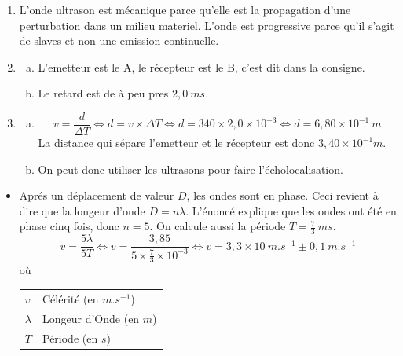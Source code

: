 \documentclass[12pt, a4paper]{article}
\makeatletter
\newenvironment{conditions}
  {\par\vspace{\abovedisplayskip}\noindent\begin{tabular}{>{$}l<{$} @{${\quad}={\quad}$} l}}
  {\end{tabular}\par\vspace{\belowdisplayskip}}
\makeatother
\begin{document}
    \begin{Exercise}[number={27}]
        \begin{enumerate}[1.]
            \item L'onde ultrason est mécanique parce qu'elle est la propagation d'une perturbation dans un milieu materiel. L'onde est progressive parce qu'il s'agit de slaves et non une emission continuelle.
            \item   \begin{enumerate}[a.]
                        \item L'emetteur est le {A}, le récepteur est le {B}, c'est dit dans la consigne.
                        \item Le retard est de à peu pres $2{,}0\ ms$.
                    \end{enumerate}
            \item   \begin{enumerate}[a.]
                        \item   \begin{equation*}
                                    v=\frac{d}{\Delta T}
                                    \iff d=v\times\Delta T
                                    \iff d=340\times 2{,}0\times 10^{-3}
                                    \iff d=6{,}80\times 10^{-1}\ m
                                \end{equation*}
                                La distance qui sépare l'emetteur et le récepteur est donc $3{,}40\times 10^{-1} m$.
                        \item On peut donc utiliser les ultrasons pour faire l'écholocalisation.
                    \end{enumerate}
        \end{enumerate}
    \end{Exercise}

    \begin{Exercise}[number={28}]
        \begin{itemize}
            \item[] Aprés un déplacement de valeur $D$, les ondes sont en phase. Ceci revient à dire que la longeur d'onde $D=n\lambda$. L'énoncé explique que les ondes ont été en phase cinq fois, donc $n=5$. On calcule aussi la période $T=\frac{7}{3}\ ms$.
            \begin{equation*}
                v=\frac{5\lambda}{5T}
                \iff v=\frac{3{,}85}{5\times\frac{7}{3}\times 10^{-3}}
                \iff v=3{,}3\times 10\ m.s^{-1} \pm 0{,}1\ m.s^{-1}
            \end{equation*} où
            \begin{conditions}
                v & Célérité (en $m.s^{-1}$) \\ 
                \lambda & Longeur d'Onde (en $m$) \\
                T & Période (en $s$) 
            \end{conditions}
        \end{itemize}
    \end{Exercise}
\end{document}
